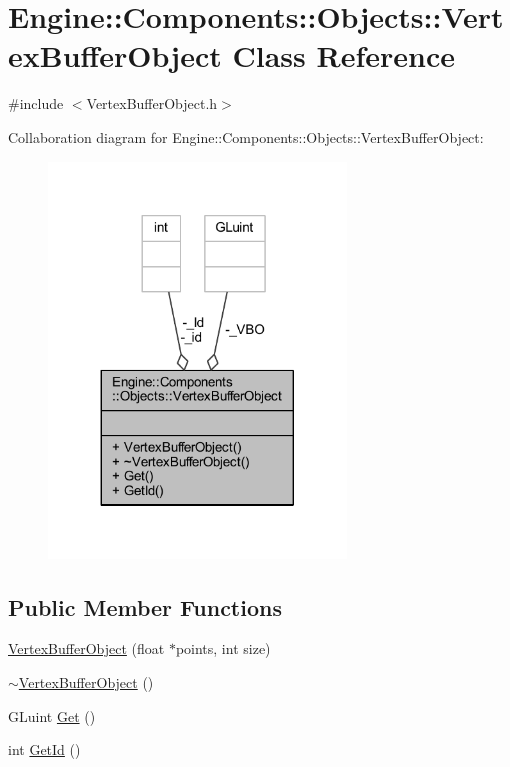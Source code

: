 \hypertarget{classEngine_1_1Components_1_1Objects_1_1VertexBufferObject}{}\section{Engine\+:\+:Components\+:\+:Objects\+:\+:Vertex\+Buffer\+Object Class Reference}
\label{classEngine_1_1Components_1_1Objects_1_1VertexBufferObject}


{\ttfamily \#include $<$Vertex\+Buffer\+Object.\+h$>$}



Collaboration diagram for Engine\+:\+:Components\+:\+:Objects\+:\+:Vertex\+Buffer\+Object\+:
\nopagebreak
\begin{figure}[H]
\begin{center}
\leavevmode
\includegraphics[width=224pt]{classEngine_1_1Components_1_1Objects_1_1VertexBufferObject__coll__graph}
\end{center}
\end{figure}
\subsection*{Public Member Functions}
\begin{DoxyCompactItemize}
\item 
\mbox{\hyperlink{classEngine_1_1Components_1_1Objects_1_1VertexBufferObject_ac6ca88e30800d79295ca9ea285101a3c}{Vertex\+Buffer\+Object}} (float $\ast$points, int size)
\item 
\mbox{\hyperlink{classEngine_1_1Components_1_1Objects_1_1VertexBufferObject_a477c0af2a3eaaae725a1347027ef87a4}{$\sim$\+Vertex\+Buffer\+Object}} ()
\item 
G\+Luint \mbox{\hyperlink{classEngine_1_1Components_1_1Objects_1_1VertexBufferObject_abf4805d63271ee1c56a15214cd75077d}{Get}} ()
\item 
int \mbox{\hyperlink{classEngine_1_1Components_1_1Objects_1_1VertexBufferObject_ada22635c60245448346653b0e82f5d9c}{Get\+Id}} ()
\end{DoxyCompactItemize}
